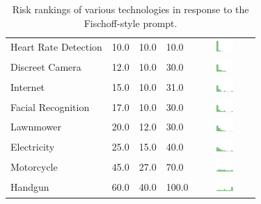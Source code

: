 \begin{table}[h]
\begin{center}
\begin{tabular}{| p{2.6cm} | p{.8cm} | p{.8cm} | p{.8cm} | c |}
Heart Rate Detection & 10.0 & 10.0 & 10.0 & \includegraphics[width = 2cm, height = 0.5cm]{tex-inputs/table-images/heartratedetectionrisk} \\ 
Discreet Camera & 12.0 & 10.0 & 30.0 & \includegraphics[width = 2cm, height = 0.5cm]{tex-inputs/table-images/discreetvideocamerarisk} \\ 
Internet & 15.0 & 10.0 & 31.0 & \includegraphics[width = 2cm, height = 0.5cm]{tex-inputs/table-images/internetrisk} \\ 
Facial Recognition & 17.0 & 10.0 & 30.0 & \includegraphics[width = 2cm, height = 0.5cm]{tex-inputs/table-images/facialrecognitionrisk} \\ 
Lawnmower & 20.0 & 12.0 & 30.0 & \includegraphics[width = 2cm, height = 0.5cm]{tex-inputs/table-images/LawnmowerRisk} \\ 
Electricity & 25.0 & 15.0 & 40.0 & \includegraphics[width = 2cm, height = 0.5cm]{tex-inputs/table-images/ElectricityRisk} \\ 
Motorcycle & 45.0 & 27.0 & 70.0 & \includegraphics[width = 2cm, height = 0.5cm]{tex-inputs/table-images/MotorcycleRisk} \\ 
Handgun & 60.0 & 40.0 & 100.0 & \includegraphics[width = 2cm, height = 0.5cm]{tex-inputs/table-images/HandgunRisk} \\ 
\hline
\end{tabular}
\caption{Risk rankings of various technologies in response to the Fischoff-style prompt.}
\label{risk}
\end{center}
\end{table}

